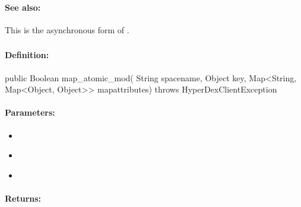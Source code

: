 \paragraph{See also:}  This is the asynchronous form of .

\pagebreak
\subsubsection{}
\label{api:java:map_atomic_mod}


\paragraph{Definition:}
\begin{javacode}
public Boolean map_atomic_mod(
        String spacename,
        Object key,
        Map<String, Map<Object, Object>> mapattributes) throws HyperDexClientException
\end{javacode}

\paragraph{Parameters:}
\begin{itemize}[noitemsep]
\item {}\\

\item {}\\

\item {}\\

\end{itemize}

\paragraph{Returns:}


\pagebreak
\subsubsection{}
\label{api:java:async_map_atomic_mod}


